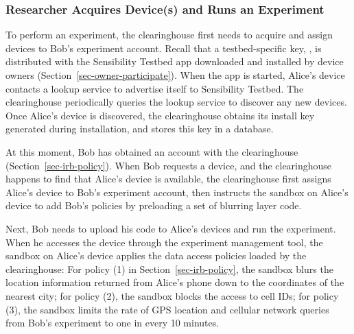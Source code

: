 \subsubsection{Researcher Acquires Device(s) and Runs an
Experiment}\label{sec-acquire-run}

To perform an experiment, the clearinghouse first needs to 
acquire and assign devices to Bob's experiment account. 
Recall that a testbed-specific key, , is distributed
with the Sensibility Testbed app downloaded and installed by device
owners (Section~\ref{sec-owner-participate}). When the app is started, 
Alice's device contacts a lookup service to advertise itself to Sensibility 
Testbed. 
The clearinghouse periodically queries the lookup service to
discover any new devices. Once Alice's device is discovered, the
clearinghouse obtains its install key  generated
during installation, and stores this key in a database. 

At this moment,  Bob has obtained an account with the clearinghouse 
(Section~\ref{sec-irb-policy}).
When Bob requests a device, and the clearinghouse
happens to find that Alice's device is available, the
clearinghouse first 
assigns Alice's device to Bob's experiment account, then instructs 
the sandbox on Alice's device to add Bob's policies by preloading
a set of blurring layer code.

Next, Bob needs to upload his code to Alice's devices and 
run the experiment. When he accesses the device through
the experiment management tool, the sandbox on Alice's device 
applies the data access policies loaded by the clearinghouse: For policy (1) in
Section~\ref{sec-irb-policy}, the sandbox blurs the location
information returned from Alice's phone down to the coordinates
of the nearest city; for policy (2), the sandbox blocks the
access to cell IDs; for policy (3), the sandbox limits the rate
of GPS location and cellular network queries from Bob's
experiment to one in every 10 minutes.


